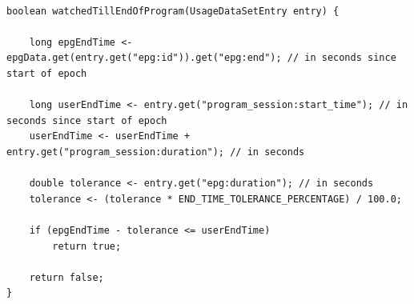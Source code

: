\documentclass[parskip=full]{scrartcl}
\begin{document}
\begin{lstlisting}[mathescape, breaklines=true,label=listing:watchedTillEndOfProgram,caption=Method watchedTillEndOfProgram.]

boolean watchedTillEndOfProgram(UsageDataSetEntry entry) {

	long epgEndTime <- epgData.get(entry.get("epg:id")).get("epg:end"); // in seconds since start of epoch
	
	long userEndTime <- entry.get("program_session:start_time"); // in seconds since start of epoch
	userEndTime <- userEndTime + entry.get("program_session:duration"); // in seconds
	
	double tolerance <- entry.get("epg:duration"); // in seconds
	tolerance <- (tolerance * END_TIME_TOLERANCE_PERCENTAGE) / 100.0;
	
	if (epgEndTime - tolerance <= userEndTime)
		return true;

	return false;
}
\end{lstlisting}
\end{document}
